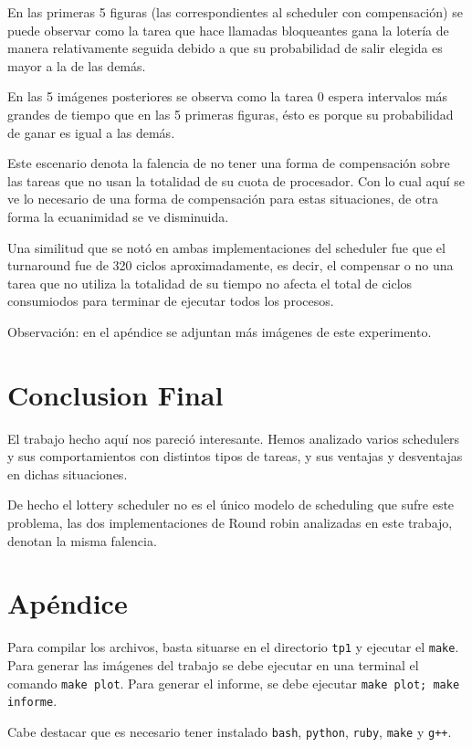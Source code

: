 \documentclass[a4paper]{article}
\begin{document}
En las primeras 5 figuras (las correspondientes al scheduler con
compensación) se puede observar como la tarea que hace llamadas bloqueantes
gana la lotería de manera relativamente seguida debido a que su probabilidad
de salir elegida es mayor a la de las demás.

En las 5 imágenes posteriores se observa como la tarea $0$ espera intervalos
más grandes de tiempo que en las 5 primeras figuras, ésto es porque su
probabilidad de ganar es igual a las demás.

Este escenario denota la falencia de no tener una forma de compensación
sobre las tareas que no usan la totalidad de su cuota de procesador. Con lo
cual aquí se ve lo necesario de una forma de compensación para estas
situaciones, de otra forma la ecuanimidad se ve disminuida.

Una similitud que se notó en ambas implementaciones del scheduler fue que el
turnaround fue de 320 ciclos aproximadamente, es decir, el compensar o no
una tarea que no utiliza la totalidad de su tiempo no afecta el total de
ciclos consumiodos para terminar de ejecutar todos los procesos.

Observación: en el apéndice se adjuntan más imágenes de este experimento.

\section{Conclusion Final}

El trabajo hecho aquí nos pareció interesante. Hemos analizado  varios
schedulers y sus comportamientos con distintos tipos de tareas, y sus
ventajas y desventajas en dichas situaciones.


De hecho el lottery scheduler no es el único modelo de scheduling que sufre
este problema, las dos implementaciones de Round robin analizadas en este
trabajo, denotan la misma falencia.

\section{Apéndice}

Para compilar los archivos, basta situarse en el directorio \verb|tp1| y
ejecutar el \verb|make|. Para generar las imágenes del trabajo se debe
ejecutar en una terminal el comando \verb|make plot|. Para generar el
informe, se debe ejecutar \verb|make plot; make informe|.

Cabe destacar que es necesario tener instalado \verb|bash|, \verb|python|,
\verb|ruby|, \verb|make| y \verb|g++|.
\end{document}
